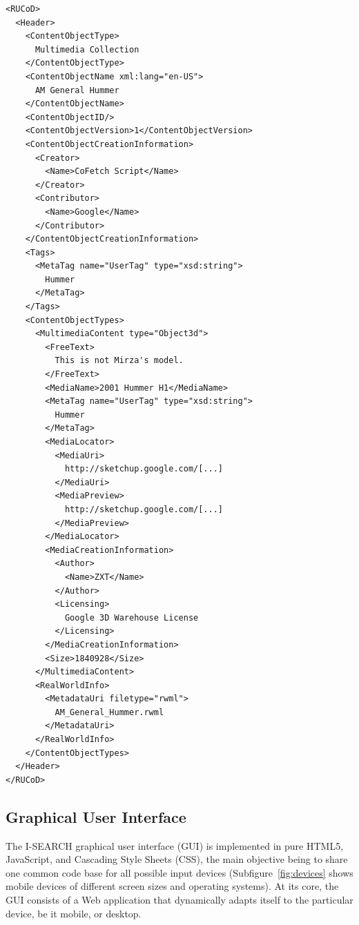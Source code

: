 \documentclass{acm_proc_article-sp}
\let\oldemph\emph
\renewcommand{\emph}[1]{\oldemph{\fontsize{9}{9}\selectfont #1}}
\begin{document}
\begin{lstlisting}[caption=Sample \emph{RUCoD} snippet (namespace declarations and some details removed for legibility reasons).,label={lst:rucod}]
<RUCoD>
  <Header>
    <ContentObjectType>
      Multimedia Collection
    </ContentObjectType>
    <ContentObjectName xml:lang="en-US">
      AM General Hummer
    </ContentObjectName>
    <ContentObjectID/>
    <ContentObjectVersion>1</ContentObjectVersion>
    <ContentObjectCreationInformation>
      <Creator>
        <Name>CoFetch Script</Name>
      </Creator>
      <Contributor>
        <Name>Google</Name>
      </Contributor>
    </ContentObjectCreationInformation>
    <Tags>
      <MetaTag name="UserTag" type="xsd:string">
        Hummer
      </MetaTag>
    </Tags>
    <ContentObjectTypes>
      <MultimediaContent type="Object3d">
        <FreeText>
          This is not Mirza's model.
        </FreeText>
        <MediaName>2001 Hummer H1</MediaName>
        <MetaTag name="UserTag" type="xsd:string">
          Hummer
        </MetaTag>
        <MediaLocator>
          <MediaUri>
            http://sketchup.google.com/[...]
          </MediaUri>
          <MediaPreview>
            http://sketchup.google.com/[...]
          </MediaPreview>
        </MediaLocator>
        <MediaCreationInformation>
          <Author>
            <Name>ZXT</Name>
          </Author>
          <Licensing>
            Google 3D Warehouse License
          </Licensing>
        </MediaCreationInformation>
        <Size>1840928</Size>
      </MultimediaContent>
      <RealWorldInfo>
        <MetadataUri filetype="rwml">
          AM_General_Hummer.rwml
        </MetadataUri>
      </RealWorldInfo>
    </ContentObjectTypes>
  </Header>
</RUCoD>
\end{lstlisting}

\subsection{Graphical User Interface}
The \mbox{I-SEARCH} graphical user interface (GUI) is implemented in pure HTML5, JavaScript, and Cascading Style Sheets (CSS), the main objective being to share one common code base for all possible input devices (Subfigure~\ref{fig:devices} shows mobile devices of different screen sizes and operating systems).
At its core, the GUI consists of a Web application that dynamically adapts itself to the particular device, be it mobile, or desktop.
\end{document}
